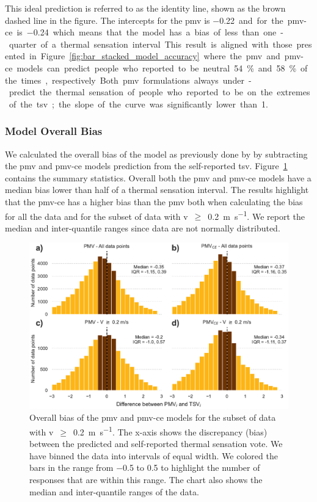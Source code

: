 This ideal prediction is referred to as the identity line, shown as the brown dashed line in the figure.
The intercepts for the \ac{pmv} is \qty{-0.22} and for the \ac{pmv-ce} is \qty{-0.24} which means that the model has a bias of less than one-quarter of a thermal sensation interval.
This result is aligned with those presented in Figure~\ref{fig:bar_stacked_model_accuracy} where the \ac{pmv} and \ac{pmv-ce} models can predict people who reported to be neutral \qty{54}{\percent} and \qty{58}{\percent} of the times, respectively.
Both \ac{pmv} formulations always under-predict the thermal sensation of people who reported to be on the extremes of the \ac{tsv};
the slope of the curve was significantly lower than 1.

\subsubsection{Model Overall Bias}\label{subsubsec:model-overall-bias}
We calculated the overall bias of the model as previously done by  by subtracting the \ac{pmv} and \ac{pmv-ce} models prediction from the self-reported \ac{tsv}.
Figure~\ref{fig:hist_discrepancies} contains the summary statistics.
Overall both the \ac{pmv} and \ac{pmv-ce} models have a median bias lower than half of a thermal sensation interval.
The results highlight that the \ac{pmv-ce} has a higher bias than the \ac{pmv} both when calculating the bias for all the data and for the subset of data with \ac{v}~$\geq$~\qty{0.2}{\m\per\s}.
We report the median and inter-quantile ranges since data are not normally distributed.
\begin{figure}[htb!]
    \centering
    \includegraphics[width=\textwidth]{figures/hist_discrepancies}
    \caption{Overall bias of the \ac{pmv} and \ac{pmv-ce} models for the subset of data with \ac{v}~$\geq$~\qty{0.2}{\m\per\s}.
    The x-axis shows the discrepancy (bias) between the predicted and self-reported thermal sensation vote.
    We have binned the data into intervals of equal width.
    We colored the bars in the range from \num{-.5} to \num{.5} to highlight the number of responses that are within this range.
    The chart also shows the median and inter-quantile ranges of the data.
    }
    \label{fig:hist_discrepancies}
\end{figure}
